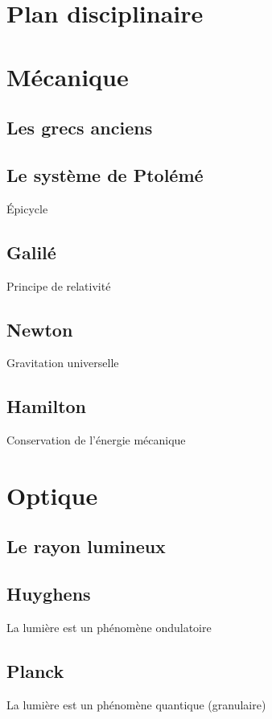 \chapter{Plan disciplinaire}


\chapter{Mécanique}
  \section{Les grecs anciens}

  \section{Le système de Ptolémé}
Épicycle
  \section{Galilé}
Principe de relativité
  \section{Newton}
Gravitation universelle
  \section{Hamilton}
Conservation de l'énergie mécanique

\chapter{Optique}
  \section{Le rayon lumineux}
  \section{Huyghens}
La lumière est un phénomène ondulatoire
  \section{Planck}
La lumière est un phénomène quantique (granulaire)


